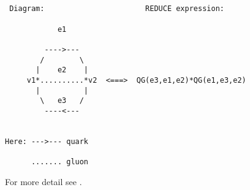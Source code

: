 \begin{verbatim}


 Diagram:                       REDUCE expression:

            e1

         ---->---
        /        \
       |    e2    |
     v1*..........*v2  <===>  QG(e3,e1,e2)*QG(e1,e3,e2)
       |          |
        \   e3   /
         ----<---


Here: --->--- quark

      ....... gluon

\end{verbatim}

For more detail see \cite{Kryukov:88a}.

